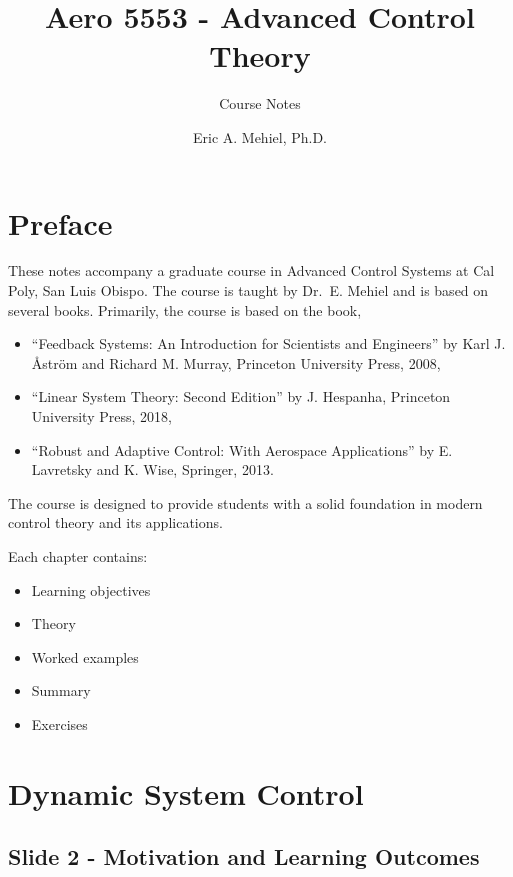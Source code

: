 \documentclass[
  letterpaper,
  DIV=11,
  numbers=noendperiod]{scrreprt}
\title{Aero 5553 - Advanced Control Theory}
\subtitle{Course Notes}
\author{Eric A. Mehiel, Ph.D.}
\date{}
\providecommand{\tightlist}{%
  \setlength{\itemsep}{0pt}\setlength{\parskip}{0pt}}
\renewcommand*\contentsname{Table of contents}
\newcommand\contentsname{Table of contents}
\begin{document}
\maketitle

\renewcommand*\contentsname{Table of contents}
{
\setcounter{tocdepth}{2}
\tableofcontents
}


\chapter{Preface}\label{preface}

These notes accompany a graduate course in Advanced Control Systems at
Cal Poly, San Luis Obispo. The course is taught by Dr.~E. Mehiel and is
based on several books. Primarily, the course is based on the book,

\begin{itemize}
\tightlist
\item
  ``Feedback Systems: An Introduction for Scientists and Engineers'' by
  Karl J. Åström and Richard M. Murray, Princeton University Press,
  2008,
\item
  ``Linear System Theory: Second Edition'' by J. Hespanha, Princeton
  University Press, 2018,
\item
  ``Robust and Adaptive Control: With Aerospace Applications'' by E.
  Lavretsky and K. Wise, Springer, 2013.
\end{itemize}

The course is designed to provide students with a solid foundation in
modern control theory and its applications.

Each chapter contains:

\begin{itemize}
\tightlist
\item
  Learning objectives
\item
  Theory
\item
  Worked examples
\item
  Summary
\item
  Exercises
\end{itemize}


\chapter{Dynamic System Control}\label{dynamic-system-control}

\section{Slide 2 - Motivation and Learning
Outcomes}\label{slide-2---motivation-and-learning-outcomes}
\end{document}
